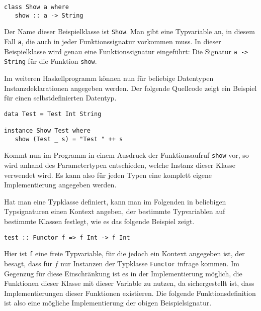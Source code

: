 
\begin{verbatim}
class Show a where
   show :: a -> String
\end{verbatim}

Der Name dieser Beispielklasse ist \texttt{Show}. Man gibt eine Typvariable an, in diesem Fall \texttt{a}, die auch in jeder
Funktionssignatur vorkommen muss. In dieser Beispielklasse wird genau eine Funktionssignatur eingeführt: Die Signatur
\texttt{a -> String} für die Funktion \texttt{show}.

Im weiteren Haskellprogramm können nun für beliebige Datentypen Instanzdeklarationen angegeben werden. Der folgende
Quellcode zeigt ein Beispiel für einen selbstdefinierten Datentyp.

\begin{verbatim}
data Test = Test Int String

instance Show Test where
   show (Test _ s) = "Test " ++ s
\end{verbatim}

Kommt nun im Programm in einem Ausdruck der Funktionsaufruf \texttt{show} vor, so wird anhand des Parametertypen
entschieden, welche Instanz dieser Klasse verwendet wird. Es kann also für jeden Typen eine komplett eigene Implementierung
angegeben werden.

Hat man eine Typklasse definiert, kann man im Folgenden in beliebigen Typsignaturen einen Kontext angeben, der
bestimmte Typvariablen auf bestimmte Klassen festlegt, wie es das folgende Beispiel zeigt.

\begin{verbatim}
test :: Functor f => f Int -> f Int
\end{verbatim}

Hier ist \texttt{f} eine freie Typvariable, für die jedoch ein Kontext angegeben ist, der besagt, dass für $f$ nur Instanzen
der Typklasse \texttt{Functor} infrage kommen. Im Gegenzug für diese Einschränkung ist es in der Implementierung möglich,
die Funktionen dieser Klasse mit dieser Variable zu nutzen, da sichergestellt ist, dass Implementierungen dieser Funktionen
existieren. Die folgende Funktionsdefinition ist also eine mögliche Implementierung der obigen Beispielsignatur.


